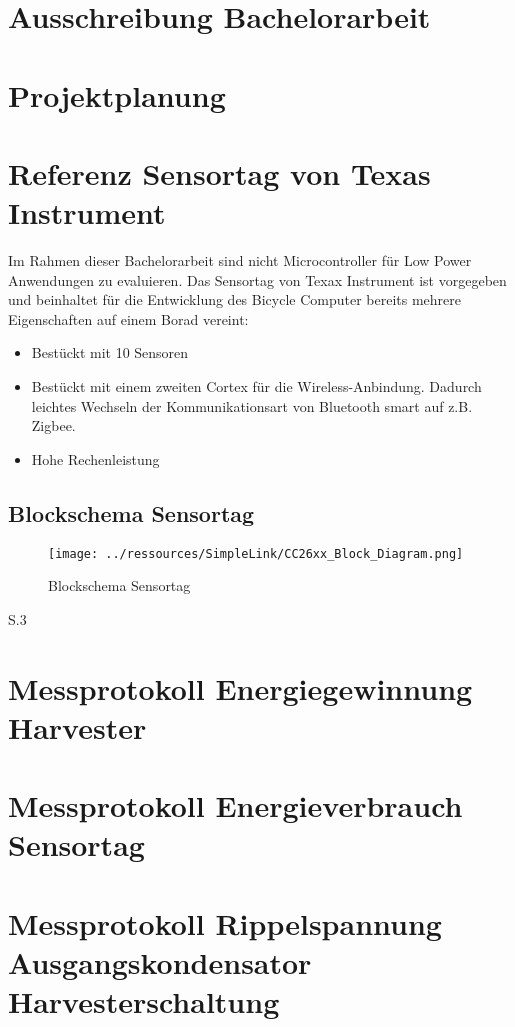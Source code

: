 

\appendix

\chapter{Ausschreibung Bachelorarbeit}\label{anhang_ausschreibung} 


\chapter{Projektplanung}\label{anhang_projektplan} 

\chapter{Referenz Sensortag von Texas Instrument}\label{anhang_sensortag} 
Im Rahmen dieser Bachelorarbeit sind nicht Microcontroller für Low Power Anwendungen zu evaluieren. Das Sensortag von Texax Instrument ist vorgegeben und beinhaltet für die Entwicklung des Bicycle Computer bereits mehrere Eigenschaften auf einem Borad vereint:

\begin{itemize}
    \item Bestückt mit 10 Sensoren
    \item Bestückt mit einem zweiten Cortex für die Wireless-Anbindung.
          Dadurch leichtes Wechseln der Kommunikationsart von Bluetooth smart auf z.B. Zigbee.
    \item Hohe Rechenleistung
\end{itemize}


\section{Blockschema Sensortag}


\begin{figure}
    \texttt{[image: ../ressources/SimpleLink/CC26xx\_Block\_Diagram.png]} 
 \caption{Blockschema Sensortag  }\label{RegelungSpannung} 
\end{figure}

\cite{Sensortag_Datasheet }S.3


\chapter{Messprotokoll Energiegewinnung Harvester}\label{anhang_messprotokoll_energie_harvester} 



\chapter{Messprotokoll Energieverbrauch Sensortag}\label{anhang_messprotokoll_energie_sensortag} 


\chapter{Messprotokoll Rippelspannung Ausgangskondensator Harvesterschaltung}\label{anhang_messprotokoll_kondensator_harvester} 
